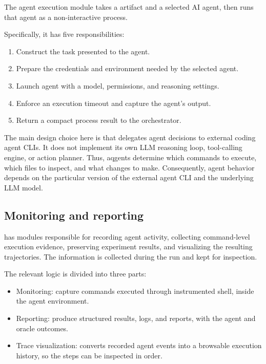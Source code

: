 The agent execution module takes a artifact and a selected AI agent, then runs that agent as a 
  non-interactive process.

Specifically, it has five responsibilities:

\begin{enumerate}
  \item Construct the task presented to the agent.
  \item Prepare the credentials and environment needed by the selected agent.
  \item Launch agent with a model, permissions, and reasoning settings.
  \item Enforce an execution timeout and capture the agent's output.
  \item Return a compact process result to the orchestrator.
\end{enumerate}

The main design choice here is that \aebench delegates agent decisions to external coding agent CLIs. 
It does not implement its own LLM reasoning loop, tool-calling engine, or action planner. 
Thus, aqgents determine which commands to execute, which files to inspect, and 
  what changes to make.
Consequently, agent behavior depends on the particular version of the external agent CLI 
  and the underlying LLM model.

\subsection{Monitoring and reporting}

\aebench has modules responsible for recording agent activity, collecting command-level execution evidence,
  preserving experiment results, and visualizing the resulting trajectories.
The information is collected during the run and kept for inspection.

The relevant logic is divided into three parts:

\begin{itemize}
  \item Monitoring: capture commands executed through 
    instrumented shell, inside the agent environment.
  \item Reporting: produce structured results, logs, and reports, 
    with the agent and oracle outcomes.
  \item Trace visualization: converts recorded agent events into a 
    browsable execution history, so the steps can be inspected in order.
\end{itemize}

